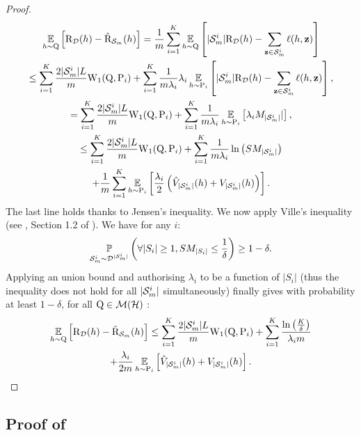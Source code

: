 \begin{noaddcontents}
\begin{proof}
        \begin{multline*}
            \operatorname*{\mathbb{E}}_{h\sim\mathrm{Q}}\Big[ \text{R}_{\mathcal{D}}(h) - \hat{\text{R}}_{\mathcal{S}_m}(h) \Big] =  \frac{1}{m}\sum_{i=1}^{K} \operatorname*{\mathbb{E}}_{h\sim\mathrm{Q}}\left[ |\mathcal{S}_m^{i}|\text{R}_{\mathcal{D}}(h) - \sum_{\mathbf{z}\in\mathcal{S}_m^{i}}\ell(h, \mathbf{z}) \right]\nonumber\\
            \le \sum_{i=1}^{K} \frac{2|\mathcal{S}_m^{i}|L}{m}\mathrm{W}_{1}(\mathrm{Q}, \mathrm{P}_i) + \sum_{i=1}^{K} \frac{1}{m\lambda_i}\lambda_i\operatorname*{\mathbb{E}}_{h\sim\mathrm{P}_i} \left[ |\mathcal{S}_m^{i}|\text{R}_{\mathcal{D}}(h) - \sum_{\mathbf{z}\in\mathcal{S}_m^{i}} \ell(h, \mathbf{z}) \right], \\
             = \sum_{i=1}^{K} \frac{2|\mathcal{S}_m^{i}|L}{m}\mathrm{W}_{1}(\mathrm{Q}, \mathrm{P}_i) + \sum_{i=1}^{K} \frac{1}{m\lambda_i}\operatorname*{\mathbb{E}}_{h\sim\mathrm{P}_i} \left[ \lambda_i M_{|\mathcal{S}_m^{i}|}| \right], \\
            \le   \sum_{i=1}^{K} \frac{2|\mathcal{S}_m^{i}|L}{m}\mathrm{W}_{1}(\mathrm{Q}, \mathrm{P}_i) + \sum_{i=1}^{K} \frac{1}{m\lambda_i} \ln\left( SM_{|\mathcal{S}_m^{i}|}  \right) 
             \\+ \frac{1}{m}\sum_{i=1}^K \operatorname*{\mathbb{E}}_{h\sim\mathrm{P}_i}\left[\frac{\lambda_i}{2}\left( \hat{V}_{|\mathcal{S}_m^{i}|}(h) + V_{|\mathcal{S}_m^{i}|}(h) \right) \right].
        \end{multline*}
        The last line holds thanks to Jensen's inequality.
        We now apply Ville's inequality (see \eg, Section 1.2 of ).
        We have for any $i$: 
        \begin{align*}
        \operatorname*{\mathbb{P}}_{\mathcal{S}_m^{i} \sim \mathcal{D}^{|\mathcal{S}_m^{i}|}}\left( \forall |S_i|\geq 1, SM_{|S_i|} \leq \frac{1}{\delta}  \right) \geq 1-\delta.
        \end{align*}
        Applying an union bound and authorising $\lambda_i$ to be a function of $|S_i|$ (thus the inequality does not hold for all $|\mathcal{S}_m^{i}|$ simultaneously) finally gives with probability at least $1-\delta$, for all $\mathrm{Q}\in \mathcal{M}(\mathcal{H})$ :
        \begin{multline*}
             \operatorname*{\mathbb{E}}_{h\sim\mathrm{Q}}\Big[ \text{R}_{\mathcal{D}}(h) - \hat{\text{R}}_{\mathcal{S}_m}(h) \Big] \leq    \sum_{i=1}^{K} \frac{2|\mathcal{S}_m^{i}|L}{m}\mathrm{W}_{1}(\mathrm{Q}, \mathrm{P}_i) + \sum_{i=1}^{K}   \frac{\ln\left( \frac{K}{\delta}  \right)}{\lambda_i m} \\
             + \frac{\lambda_i}{2m}\operatorname*{\mathbb{E}}_{h\sim\mathrm{P}_i}\left[ \hat{V}_{|\mathcal{S}_m^{i}|}(h) + V_{|\mathcal{S}_m^{i}|}(h) \right].
        \end{multline*}    
    \end{proof}
    
    \subsection{Proof of }
    \label{sec:proof-supervised}
    

\end{noaddcontents}

